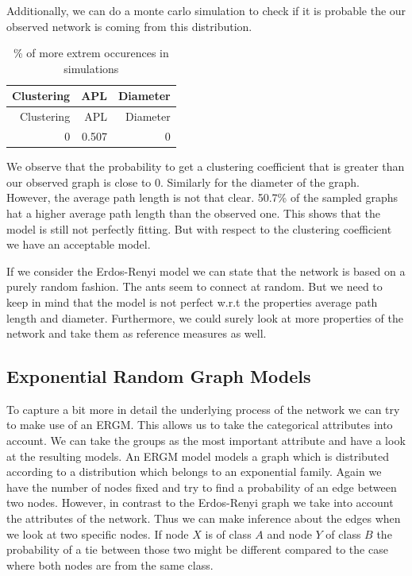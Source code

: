 \documentclass[
]{article}
\begin{document}
Additionally, we can do a monte carlo simulation to check if it is
probable the our observed network is coming from this distribution.

\begin{longtable}[]{@{}rrr@{}}
\caption{\% of more extrem occurences in simulations}\tabularnewline
\toprule
Clustering & APL & Diameter\tabularnewline
\midrule
\endfirsthead
\toprule
Clustering & APL & Diameter\tabularnewline
\midrule
\endhead
0 & 0.507 & 0\tabularnewline
\bottomrule
\end{longtable}

We observe that the probability to get a clustering coefficient that is
greater than our observed graph is close to 0. Similarly for the
diameter of the graph. However, the average path length is not that
clear. 50.7\% of the sampled graphs hat a higher average path length
than the observed one. This shows that the model is still not perfectly
fitting. But with respect to the clustering coefficient we have an
acceptable model.

If we consider the Erdos-Renyi model we can state that the network is
based on a purely random fashion. The ants seem to connect at random.
But we need to keep in mind that the model is not perfect w.r.t the
properties average path length and diameter. Furthermore, we could
surely look at more properties of the network and take them as reference
measures as well.

\hypertarget{exponential-random-graph-models}{%
\subsection{Exponential Random Graph
Models}\label{exponential-random-graph-models}}

To capture a bit more in detail the underlying process of the network we
can try to make use of an ERGM. This allows us to take the categorical
attributes into account. We can take the groups as the most important
attribute and have a look at the resulting models. An ERGM model models
a graph which is distributed according to a distribution which belongs
to an exponential family. Again we have the number of nodes fixed and
try to find a probability of an edge between two nodes. However, in
contrast to the Erdos-Renyi graph we take into account the attributes of
the network. Thus we can make inference about the edges when we look at
two specific nodes. If node \(X\) is of class \(A\) and node \(Y\) of
class \(B\) the probability of a tie between those two might be
different compared to the case where both nodes are from the same class.
\end{document}
